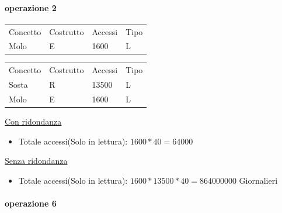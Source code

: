 \paragraph{operazione 2}

\begin{center}
    \begin{minipage}{.48\linewidth}
        \begin{tabularx}{\linewidth}{|X|l|l|l|}
            \hline
            \rowcolor{gray!30}
            \multicolumn{4}{|c|}{\textbf{Con ridondanza}}\\
            \hline
            \rowcolor{gray!15}
            Concetto & Costrutto & Accessi & Tipo\\
            \hline
            Molo & E & 1600 & L\\
            \hline
        \end{tabularx}
    \end{minipage}
    \begin{minipage}{.48\linewidth}
        \begin{tabularx}{\linewidth}{|X|l|l|l|}
            \hline
            \rowcolor{gray!30}
            \multicolumn{4}{|c|}{\textbf{Senza ridondanza}}\\
            \hline
            \rowcolor{gray!15}
            Concetto & Costrutto & Accessi & Tipo\\
            \hline
            Sosta & R & 13500 & L\\
            \hline
            Molo & E & 1600 & L\\
            \hline
        \end{tabularx}
    \end{minipage}
\end{center}

\underline{Con ridondanza}
\begin{itemize}
    \item Totale accessi(Solo in lettura): $1600*40 = 64000$
\end{itemize}
\underline{Senza ridondanza}
\begin{itemize}
    \item Totale accessi(Solo in lettura): $1600*13500*40 = 864000000$ Giornalieri
\end{itemize}

\paragraph{operazione 6}

